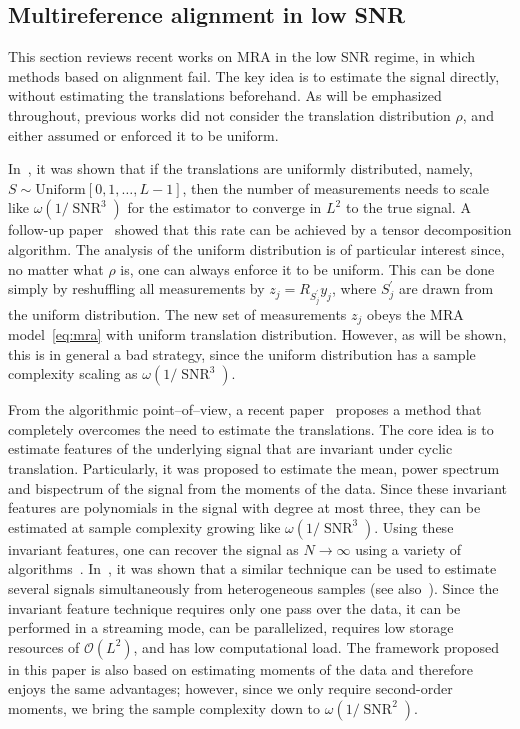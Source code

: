 \documentclass{IEEEtran}
\numberwithin{equation}{section}
\numberwithin{figure}{section}
\theoremstyle{plain}
\theoremstyle{definition}
\theoremstyle{remark}
\theoremstyle{plain}
\theoremstyle{remark}
\theoremstyle{plain}
\theoremstyle{plain}
\theoremstyle{remark}
\newcommand{\SNR}{\operatorname{SNR}}
\begin{document}
\subsection{Multireference alignment in low SNR}
\label{subsec:MRA_low_SNR}

This section reviews recent works on MRA in the low SNR regime, in which methods based on alignment fail.
The key idea is to estimate the signal directly, without estimating the translations beforehand. As will be emphasized throughout, previous works did not consider the translation distribution $\rho$, and either assumed or enforced it to be uniform. 

In~\cite{bandeira2017optimal}, it was shown that if the translations are uniformly distributed, namely, $S\sim \text{Uniform}[0,1,\dots,L-1]$, then the number of measurements needs to scale like $\omega(1/\SNR^3)$ for the estimator to converge in $L^2$ to the true signal. A follow-up paper~\cite{perry2017sample} showed that this rate can be achieved by a tensor decomposition algorithm.
The analysis of the uniform distribution is of particular interest since, no matter what $\rho$ is, one can always enforce it to be uniform. This can be done simply by reshuffling all measurements by $z_j=R_{S^\prime_j}y_j$, where $S^\prime_j$ are drawn from the uniform distribution. The new set of measurements $z_j$ obeys the MRA model~\eqref{eq:mra} with uniform translation distribution. However, as will be shown, this is in general a bad strategy, since the uniform distribution has a sample complexity scaling as $\omega(1/\SNR^3)$.

From the algorithmic point--of--view, a recent paper~\cite{bendory2017bispectrum} proposes a method that completely overcomes the need to estimate the translations. The core idea is to estimate features of the underlying signal that are invariant under cyclic translation. Particularly, it was proposed to estimate the mean, power spectrum and bispectrum of the signal from the moments of the data. Since these invariant features are polynomials in the signal with degree at most three, they can be estimated at sample complexity growing like $\omega(1/\SNR^3)$. Using these invariant features, one can recover the signal as $N \to \infty$ using a variety of algorithms~\cite{bendory2017bispectrum}. In~\cite{boumal2018heterogeneous}, it was shown that a similar technique can be used to estimate several signals simultaneously from heterogeneous samples (see also~\cite[Section~5]{perry2017sample}). Since the invariant feature technique requires only one pass over the data, it can be performed in a streaming mode, can be parallelized, requires low storage resources of $\mathcal{O}(L^2)$, and has low computational load. The framework proposed in this paper is also based on estimating moments of the data and therefore enjoys the same advantages; however, since we only require second-order moments, we bring the sample complexity down to $\omega(1/\SNR^2)$. 
\end{document}
